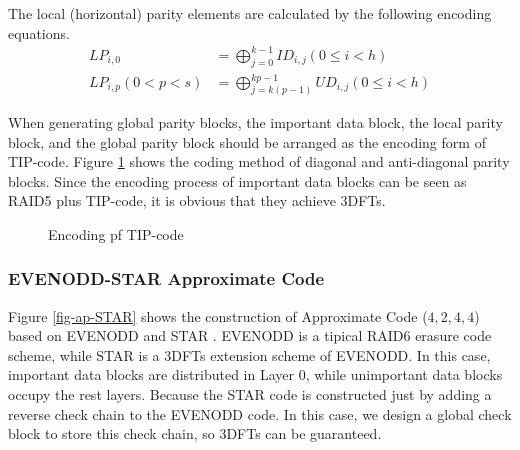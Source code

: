\documentclass[sigconf]{acmart}
\begin{document}
The local (horizontal) parity elements are calculated by the following encoding equations.
\begin{align}
    LP_{i,0} &= \bigoplus_{j=0}^{k-1} ID_{i,j} (0 \leqslant i < h)\\
    LP_{i,p}(0<p<s) &= \bigoplus_{j=k(p-1)}^{kp-1} UD_{i,j} (0 \leqslant i < h)
\end{align}

When generating global parity blocks, the important data block, the local parity block, and the global parity block should be arranged as the encoding form of TIP-code. Figure \ref{fig-TIP} shows the coding method of diagonal and anti-diagonal parity blocks.
Since the encoding process of important data blocks can be seen as RAID5 plus TIP-code, it is obvious that they achieve 3DFTs.

\begin{figure}[h]
\caption{Encoding pf TIP-code}
\label{fig-TIP}
\end{figure}

\subsubsection{EVENODD-STAR Approximate Code}
Figure \ref{fig-ap-STAR} shows the construction of Approximate Code ($4,2,4,4$) based on EVENODD \cite{blaum1995evenodd} and STAR \cite{huang2008star}. 
EVENODD is a tipical RAID6 erasure code scheme, while STAR is a 3DFTs extension scheme of EVENODD. In this case, important data blocks are distributed in Layer 0, while unimportant data blocks occupy the rest layers. 
Because the STAR code is constructed just by adding a reverse check chain to the EVENODD code. In this case, we design a global check block to store this check chain, so 3DFTs can be guaranteed.
\end{document}
